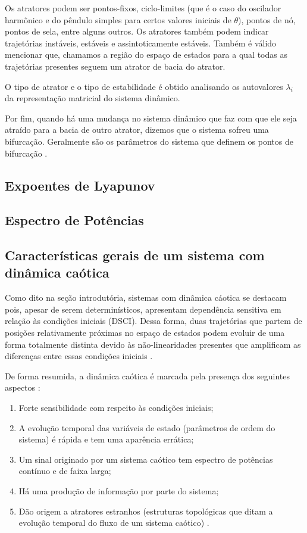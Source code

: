 \documentclass[a4paper, 12pt]{article}
\begin{document}
Os atratores podem ser pontos-fixos, ciclo-limites (que é o caso do oscilador harmônico e do pêndulo simples para certos valores iniciais de $\theta$), pontos de nó, pontos de sela, entre alguns outros. Os atratores também podem indicar trajetórias instáveis, estáveis e assintoticamente estáveis. Também é válido mencionar que, chamamos a região do espaço de estados para a qual todas as trajetórias presentes seguem um atrator de bacia do atrator.

O tipo de atrator e o tipo de estabilidade é obtido analisando os autovalores $\lambda_i$ da representação matricial do sistema dinâmico.

Por fim, quando há uma mudança no sistema dinâmico que faz com que ele seja atraído para a bacia de outro atrator, dizemos que o sistema sofreu uma bifurcação. Geralmente são os parâmetros do sistema que definem os pontos de bifurcação \cite{fiedler1994caos}.

\subsection{Expoentes de Lyapunov}

\subsection{Espectro de Potências}

\subsection{Características gerais de um sistema com dinâmica caótica}

Como dito na seção introdutória, sistemas com dinâmica cáotica se destacam pois, apesar de serem determinísticos, apresentam dependência sensitiva em relação às condições iniciais (DSCI). Dessa forma, duas trajetórias que partem de posições relativamente próximas no espaço de estados podem evoluir de uma forma totalmente distinta devido às não-linearidades presentes que amplificam as diferenças entre essas condições iniciais \cite{fiedler1994caos}.

De forma resumida, a dinâmica caótica é marcada pela presença dos seguintes aspectos \cite{attux2001dinamica}:
\begin{enumerate}
\item Forte sensibilidade com respeito às condições iniciais;
\item A evolução temporal das variáveis de estado (parâmetros de ordem do sistema) é rápida e tem uma aparência errática;
\item Um sinal originado por um sistema caótico tem espectro de potências contínuo e de faixa larga;
\item Há uma produção de informação por parte do sistema;
\item Dão origem a atratores estranhos (estruturas topológicas que ditam a evolução temporal do fluxo de um sistema caótico) \cite{ruelle1971nature}.
\end{enumerate}
\end{document}
